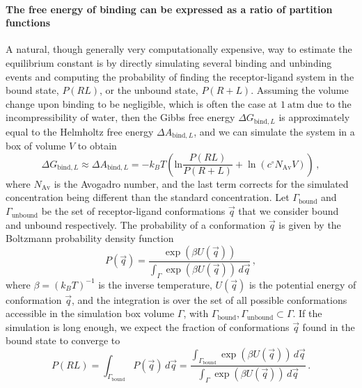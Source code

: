 \documentclass[9pt,bestpractices]{livecoms}
\begin{document}
\paragraph{The free energy of binding can be expressed as a ratio of partition functions}
A natural, though generally very computationally expensive, way to estimate the equilibrium constant is by directly simulating several binding and unbinding events and computing the probability of finding the receptor-ligand system in the bound state, $P(RL)$, or the unbound state, $P(R+L)$.
Assuming the volume change upon binding to be negligible, which is often the case at $1~\mathrm{atm}$ due to the incompressibility of water, then the Gibbs free energy $\Delta G_{\mathrm{bind}, L}$ is approximately equal to the Helmholtz free energy $\Delta A_{\mathrm{bind}, L}$, and we can simulate the system in a box of volume $V$ to obtain~\cite{jong2011determining}
\begin{equation}\label{eq:binding-free-energy-from-bound-unbound-probability-ratio}
    \Delta G_{\mathrm{bind},L} \approx \Delta A_{\mathrm{bind}, L} = - k_B T  \left( \mathrm{ln} \frac{P(RL)}{P(R+L)} + \ln \left( c^\circ N_{\mathrm{Av}} V \right) \right) \, ,
\end{equation}
where $N_{\mathrm{Av}}$ is the Avogadro number, and the last term corrects for the simulated concentration being different than the standard concentration.
Let $\Gamma_{\mathrm{bound}}$ and $\Gamma_{\mathrm{unbound}}$ be the set of receptor-ligand conformations $\vec{q}$ that we consider bound and unbound respectively.
The probability of a conformation $\vec{q}$ is given by the Boltzmann probability density function
\begin{equation}
    P(\vec{q}) = \frac{\exp\left( \beta U(\vec{q}) \right)}{\int_{\Gamma} \exp\left( \beta U(\vec{q}) \right) \, d\vec{q}} \, ,
    \label{eq:conf_probability}
\end{equation}
where $\beta = (k_B T)^{-1}$ is the inverse temperature, $U(\vec{q})$ is the potential energy of conformation $\vec{q}$, and the integration is over the set of all possible conformations accessible in the simulation box volume $\Gamma$, with $\Gamma_{\mathrm{bound}},\Gamma_{\mathrm{unbound}} \subset \Gamma$.
If the simulation is long enough, we expect the fraction of conformations $\vec{q}$ found in the bound state to converge to
\begin{equation}
    P(RL) = \int_{\Gamma_{\mathrm{bound}}} P(\vec{q}) \, d\vec{q} = \frac{\int_{\Gamma_{\mathrm{bound}}} \exp\left( \beta U(\vec{q}) \right) \, d\vec{q}}{\int_{\Gamma} \exp\left( \beta U(\vec{q}) \right) \, d\vec{q}} \, .
\end{equation}
\end{document}
